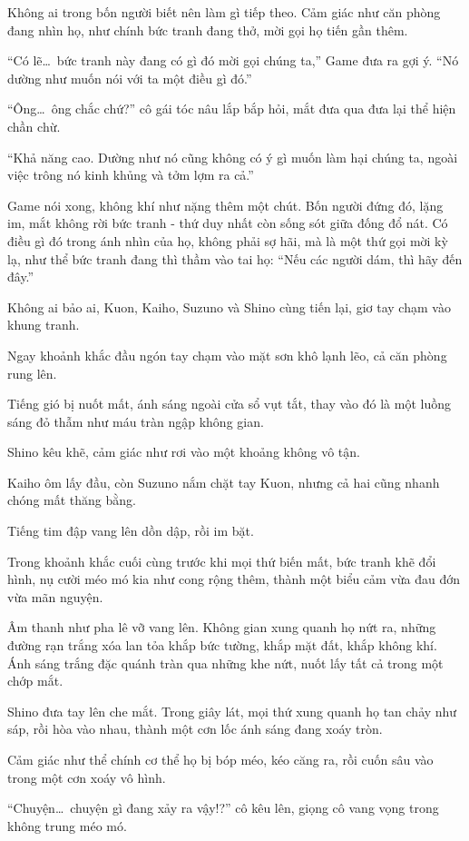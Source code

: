 \documentclass[../main.tex]{subfiles}
\begin{document}
Không ai trong bốn người biết nên làm gì tiếp theo. Cảm giác như căn phòng đang nhìn họ, như chính bức tranh đang thở, mời gọi họ tiến gần thêm.

``Có lẽ\dots\ bức tranh này đang có gì đó mời gọi chúng ta,'' Game đưa ra gợi ý. ``Nó dường như muốn nói với ta một điều gì đó.''

``Ông\dots\ ông chắc chứ?'' cô gái tóc nâu lắp bắp hỏi, mắt đưa qua đưa lại thể hiện chần chừ.

``Khả năng cao. Dường như nó cũng không có ý gì muốn làm hại chúng ta, ngoài việc trông nó kinh khủng và tởm lợm ra cả.''

Game nói xong, không khí như nặng thêm một chút. Bốn người đứng đó, lặng im, mắt không rời bức tranh - thứ duy nhất còn sống sót giữa đống đổ nát. Có điều gì đó trong ánh nhìn của họ, không phải sợ hãi, mà là một thứ gọi mời kỳ lạ, như thể bức tranh đang thì thầm vào tai họ: ``Nếu các người dám, thì hãy đến đây.''

Không ai bảo ai, Kuon, Kaiho, Suzuno và Shino cùng tiến lại, giơ tay chạm vào khung tranh.

Ngay khoảnh khắc đầu ngón tay chạm vào mặt sơn khô lạnh lẽo, cả căn phòng rung lên.

Tiếng gió bị nuốt mất, ánh sáng ngoài cửa sổ vụt tắt, thay vào đó là một luồng sáng đỏ thẫm như máu tràn ngập không gian.

Shino kêu khẽ, cảm giác như rơi vào một khoảng không vô tận.

Kaiho ôm lấy đầu, còn Suzuno nắm chặt tay Kuon, nhưng cả hai cũng nhanh chóng mất thăng bằng.

Tiếng tim đập vang lên dồn dập, rồi im bặt.

Trong khoảnh khắc cuối cùng trước khi mọi thứ biến mất, bức tranh khẽ đổi hình, nụ cười méo mó kia như cong rộng thêm, thành một biểu cảm vừa đau đớn vừa mãn nguyện.

Âm thanh như pha lê vỡ vang lên. Không gian xung quanh họ nứt ra, những đường rạn trắng xóa lan tỏa khắp bức tường, khắp mặt đất, khắp không khí. Ánh sáng trắng đặc quánh tràn qua những khe nứt, nuốt lấy tất cả trong một chớp mắt.

Shino đưa tay lên che mắt. Trong giây lát, mọi thứ xung quanh họ tan chảy như sáp, rồi hòa vào nhau, thành một cơn lốc ánh sáng đang xoáy tròn.

Cảm giác như thể chính cơ thể họ bị bóp méo, kéo căng ra, rồi cuốn sâu vào trong một cơn xoáy vô hình.

``Chuyện\dots\ chuyện gì đang xảy ra vậy!?'' cô kêu lên, giọng cô vang vọng trong không trung méo mó.
\end{document}
